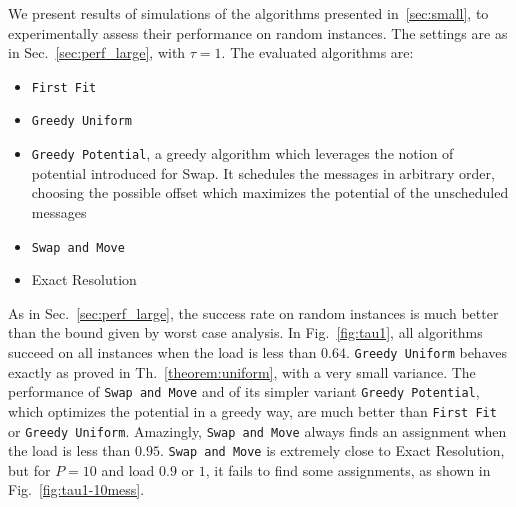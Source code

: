 \documentclass[a4paper,cleveref, autoref, thm-restate,UKenglish]{lipics-v2019}
\newcommand\firstfit{\texttt{First Fit}\xspace}
\newcommand\greedyuniform{\texttt{Greedy Uniform}\xspace}
\newcommand\swapandmove{\texttt{Swap and Move}\xspace}
\newcommand\greedypotential{\texttt{Greedy Potential}\xspace}
\begin{document}
We present results of simulations of the algorithms presented in~\ref{sec:small}, to experimentally assess their performance on random instances. The settings are as in Sec.~\ref{sec:perf_large}, with $\tau = 1$.
The evaluated algorithms are:

\begin{itemize}
  \item \firstfit
  \item \greedyuniform 
  \item \greedypotential, a greedy algorithm which leverages the notion of potential introduced for Swap. 
  It schedules the messages in arbitrary order, choosing the possible offset which maximizes the potential of the unscheduled messages
  \item \swapandmove 
  \item Exact Resolution
\end{itemize}

As in Sec.~\ref{sec:perf_large}, the success rate on random instances is much better than the bound given by worst case analysis. In Fig.~\ref{fig:tau1}, all algorithms succeed on all instances when the load is less than $0.64$. \greedyuniform behaves exactly as proved in Th.~\ref{theorem:uniform}, with a very small variance. The performance of \swapandmove and of its simpler variant \greedypotential, which optimizes the potential in a greedy way, are much better than \firstfit or \greedyuniform. Amazingly, \swapandmove always finds an assignment when the load is less than $0.95$. \swapandmove is extremely close to Exact Resolution, but for $P=10$ and load $0.9$ or $1$, it fails to find some assignments, as shown in Fig.~\ref{fig:tau1-10mess}.
\end{document}

